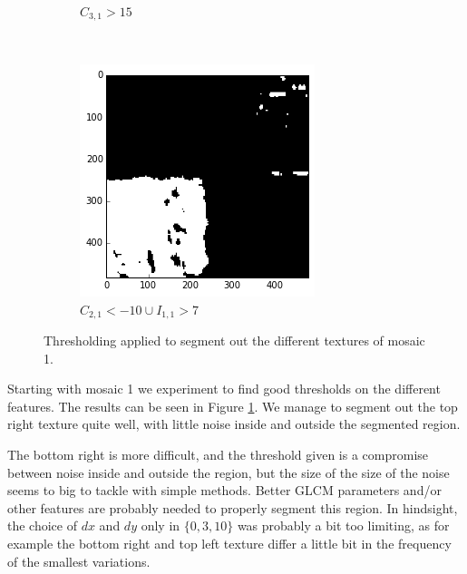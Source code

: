 \documentclass[a4paper]{article}
\begin{document}
\begin{figure}
\begin{subfigure}[b]{0.30\textwidth}
        \caption{%
            $C_{3,1} > 15$
        }
    \end{subfigure}
    ~
    \begin{subfigure}[b]{0.30\textwidth}
        \centering
        \includegraphics[width=\textwidth]{segm_1_c21_i11.png}
        \caption{%
            $C_{2,1} < -10 \cup I_{1,1} > 7$
        }
    \end{subfigure}
    \caption{%
        Thresholding applied to segment out the different textures of
        mosaic 1.
    }
    \label{fig:m1_segm}
\end{figure}

Starting with mosaic 1 we experiment to find good thresholds on the
different features. The results can be seen in Figure \ref{fig:m1_segm}.
We manage to segment out the top right texture quite well, with little
noise inside and outside the segmented region.

The bottom right is more difficult, and the threshold given is a
compromise between noise inside and outside the region, but the size of
the size of the noise seems to big to tackle with simple methods. Better
GLCM parameters and/or other features are probably needed to properly
segment this region. In hindsight, the choice of $dx$ and $dy$ only in
$\{0, 3, 10\}$ was probably a bit too limiting, as for example the
bottom right and top left texture differ a little bit in the frequency
of the smallest variations.
\end{document}
